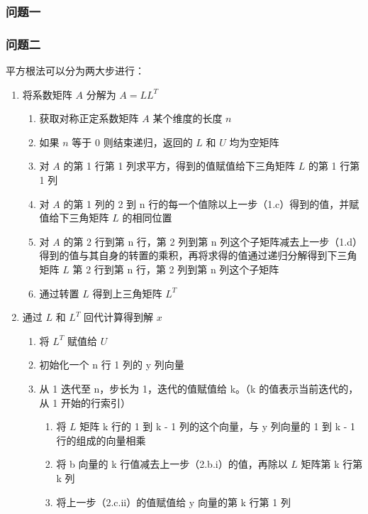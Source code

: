 \subsubsection{问题一}

\subsubsection{问题二}

平方根法可以分为两大步进行：

\begin{enumerate}
    \item 将系数矩阵 $A$ 分解为 $A = LL^T$
          \begin{enumerate}
              \item 获取对称正定系数矩阵 $A$ 某个维度的长度 $n$
              \item 如果 $n$ 等于 0 则结束递归，返回的 $L$ 和 $U$ 均为空矩阵
              \item 对 $A$ 的第 1 行第 1 列求平方，得到的值赋值给下三角矩阵 $L$ 的第 1 行第 1 列
              \item 对 $A$ 的第 1 列的 2 到 n 行的每一个值除以上一步（1.c）得到的值，并赋值给下三角矩阵 $L$ 的相同位置
              \item 对 $A$ 的第 2 行到第 n 行，第 2 列到第 n 列这个子矩阵减去上一步（1.d）得到的值与其自身的转置的乘积，再将求得的值通过递归分解得到下三角矩阵 $L$ 第 2 行到第 n 行，第 2 列到第 n 列这个子矩阵
              \item 通过转置 $L$ 得到上三角矩阵 $L^T$
          \end{enumerate}
    \item 通过 $L$ 和 $L^T$ 回代计算得到解 $x$
          \begin{enumerate}
              \item 将 $L^T$ 赋值给 $U$
              \item 初始化一个 n 行 1 列的 y 列向量
              \item 从 1 迭代至 n，步长为 1，迭代的值赋值给 k。（k 的值表示当前迭代的，从 1 开始的行索引）
                    \begin{enumerate}
                        \item 将 $L$ 矩阵 k 行的 1 到 k - 1 列的这个向量，与 y 列向量的 1 到 k - 1 行的组成的向量相乘
                        \item 将 b 向量的 k 行值减去上一步（2.b.i）的值，再除以 $L$ 矩阵第 k 行第 k 列
                        \item 将上一步（2.c.ii）的值赋值给 y 向量的第 k 行第 1 列

\end{enumerate}
\end{enumerate}
\end{enumerate}
